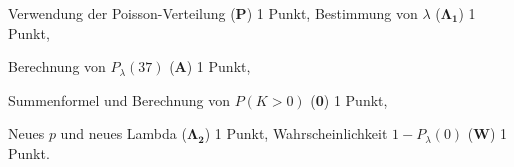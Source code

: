 \begin{bewertung}
Verwendung der Poisson-Verteilung ({\bf P}) 1 Punkt,
Bestimmung von $\lambda$ ($\bm{\Lambda_1}$) 1 Punkt,
\begin{teilaufgaben}
\item Berechnung von $P_\lambda(37)$ ({\bf A}) 1 Punkt,
\item Summenformel und Berechnung von $P(K>0)$ ({\bf 0}) 1 Punkt,
\item Neues $p$ und neues Lambda ($\bm{\Lambda_2}$) 1 Punkt,
Wahrscheinlichkeit $1-P_\lambda(0)$ ({\bf W}) 1 Punkt.
\end{teilaufgaben}
\end{bewertung}

